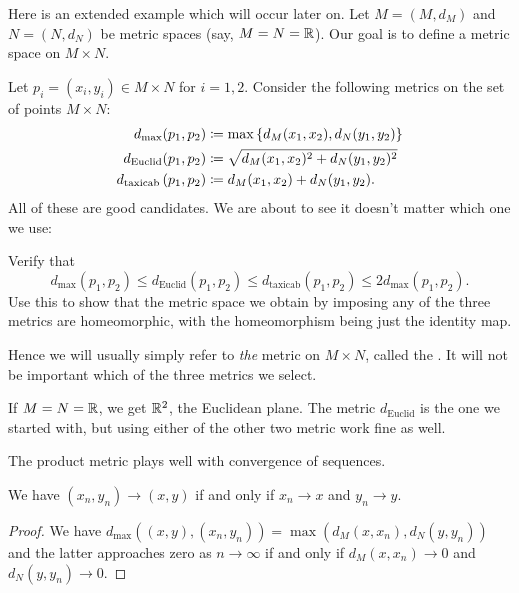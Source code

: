 Here is an extended example which will occur later on.
Let $M = (M, d_M)$ and $N = (N, d_N)$ be metric spaces (say, $M = N = \mathbb R$).
Our goal is to define a metric space on $M \times N$.

Let $p_i = (x_i,y_i) \in M \times N$ for $i=1,2$.
Consider the following metrics on the set of points $M \times N$:
\begin{align*}
	d_{\text{max}} ( p_1, p_2 )
		&\coloneqq \max \left\{ d_M(x_1, x_2), d_N(y_1, y_2) \right\}  \\
	d_{\text{Euclid}} ( p_1, p_2 )
		&\coloneqq \sqrt{d_M(x_1,x_2)^2 + d_N(y_1, y_2)^2} \\
	d_{\text{taxicab}} \left( p_1, p_2 \right)
		&\coloneqq d_M(x_1, x_2) + d_N(y_1, y_2).
\end{align*}
All of these are good candidates.
We are about to see it doesn't matter which one we use:
\begin{exercise}
Verify that
\[ d_{\text{max}}(p_1,p_2)
	\le d_{\text{Euclid}}(p_1, p_2)
	\le d_{\text{taxicab}}(p_1, p_2)
	\le 2d_{\text{max}}(p_1, p_2). \]
Use this to show that the metric space we obtain
by imposing any of the three metrics are homeomorphic,
with the homeomorphism being just the identity map.
\end{exercise}

\begin{definition}
	Hence we will usually simply refer to
	\emph{the} metric on $M \times N$,
	called the .
	It will not be important which of the three metrics we select.
\end{definition}

\begin{example}[$\RR^2$]
	If $M = N = \mathbb R$, we get $\RR^2$, the Euclidean plane.
	The metric $d_{\text{Euclid}}$ is the one we started with,
	but using either of the other two metric work fine as well.
\end{example}

The product metric plays well with convergence of sequences.
\begin{proposition}
	We have $(x_n, y_n) \to (x,y)$
	if and only if $x_n \to x$ and $y_n \to y$.
\end{proposition}
\begin{proof}
	We have $d_{\text{max}} \left( (x,y), (x_n, y_n) \right)
	= \max\left( d_M(x, x_n), d_N(y, y_n) \right)$
	and the latter approaches zero as $n \to \infty$
	if and only if $d_M(x,x_n) \to 0$ and $d_N(y, y_n) \to 0$.
\end{proof}

